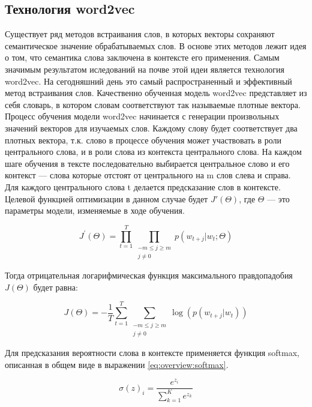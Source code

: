\subsection{Технология word2vec}\label{subsec:overview:overview_word2vec}
Существует ряд методов встраивания слов, в которых векторы сохраняют семантическое значение обрабатываемых слов. В основе этих методов лежит идея о том, что семантика слова заключена в контексте его применения. Самым значимым результатом иследований на почве этой идеи является технология word2vec. На сегодняшний день это самый распространенный и эффективный метод встраивания слов. Качественно обученная модель word2vec представляет из себя словарь, в котором словам соответствуют так называемые плотные вектора.
Процесс обучения модели word2vec начинается с генерации произвольных значений векторов для изучаемых слов. Каждому слову будет соответствует два плотных вектора, т.к. слово в процессе обучения может участвовать в роли центрального слова, и в роли слова из контекста центрального слова. На каждом шаге обучения в тексте последовательно выбирается центральное слово и его контекст --- слова которые отстоят от центрального на m слов слева и справа. Для каждого центрального слова t делается предсказание слов в контексте. Целевой функцией оптимизации в данном случае будет $ J'(\Theta) $, где $ \Theta $ --- это параметры модели, изменяемые в ходе обучения.

\begin{equation} \label{eq:overview:word2vec:Jprime}
  J^{\prime}(\Theta) = \prod_{t=1}^{T}\prod_{\substack{-m\leq j \geq m\\j \neq 0}}p(w_{t+j}|w_{t};\Theta)
\end{equation}

Тогда отрицательная логарифмическая функция максимального правдопадобия $ J(\Theta) $ будет равна:

\begin{equation} \label{eq:overview:word2vec:J}
  J(\Theta) = -\frac{1}{T}\sum_{t=1}^{T}\sum_{\substack{-m\leq j \geq m\\j \neq 0}}\log(p(w_{t+j}|w_{t}))
\end{equation}

Для предсказания вероятности слова в контексте применяется функция softmax, описанная в общем виде в выражении \ref{eq:overview:softmax}.

\begin{equation}
  \label{eq:overview:softmax}
  \sigma(z)_i = \frac{e^{z_i}}{\sum_{k=1}^{K}e^{z_k}}
\end{equation}

